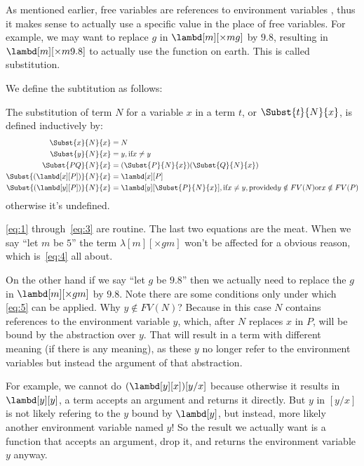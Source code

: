 \documentclass[../../../include/open-logic-section]{subfiles}
\begin{document}

As mentioned earlier, free variables are references to environment variables
, thus it makes sense to actually use a specific value in the place of free
variables. For example, we may want to replace $g$ in
$\lambd[m][\times m g]$ by $9.8$, resulting in $\lambd[m][\times m
9.8]$ to actually use the function on earth. This is
called substitution.

We define the subtitution as follows:

\begin{defn}[Substitution]
  The substitution of term $N$ for a variable $x$ in a term $t$, or
  $\Subst{t}{N}{x}$,  is defined inductively by:
  \begin{align}
    \Subst{x}{N}{x}       &= N \label{eq:1} \\
    \Subst{y}{N}{x}       &= y, \text{if} x \neq y \label{eq:2} \\
    \Subst{PQ}{N}{x} &= (\Subst{P}{N}{x}) (\Subst{Q}{N}{x}) \label{eq:3} \\
    \Subst{(\lambd[x][P])}{N}{x}  &= \lambd[x][P] \label{eq:4} \\
    \Subst{(\lambd[y][P])}{N}{x}  &= \lambd[y][\Subst{P}{N}{x}], \text{if} x \neq y,
    \text{provided} y \notin FV(N) \text{or} x \notin FV(P) \label{eq:5}
  \end{align}
  otherwise it's undefined.
\end{defn}

\eqref{eq:1} through~\eqref{eq:3} are routine. The last two equations are
the meat. When we say ``let $m$ be $5$'' the term
$\lambda[m][\times g m]$ won't be affected for a obvious reason, which
is~\eqref{eq:4} all about. 

On the other hand if we say ``let $g$ be $9.8$'' then we actually need
to replace the $g$ in $\lambd[m][\times g m]$ by $9.8$. Note there are
some conditions only under which
\eqref{eq:5} can be applied. Why $y \notin FV(N)$? Because in this
case $N$ contains references to the environment variable $y$, which,
after $N$ replaces $x$ in $P$, will be bound by the abstraction over
$y$. That will result in a term with different meaning (if there is any
meaning), as these $y$
no longer refer to the environment variables but instead the argument
of that abstraction. 

For example, we cannot do $(\lambd[y][x])[y/x]$ because
otherwise it results in $\lambd[y][y]$, a term accepts an argument and
returns it directly. But $y$ in $[y/x]$ is not likely refering
to the $y$ bound by $\lambd[y]$, but instead, more likely another
environment variable named $y$! So the result we actually want is a
function that accepts an argument, drop it, and returns the
environment variable $y$ anyway.
\end{document}
